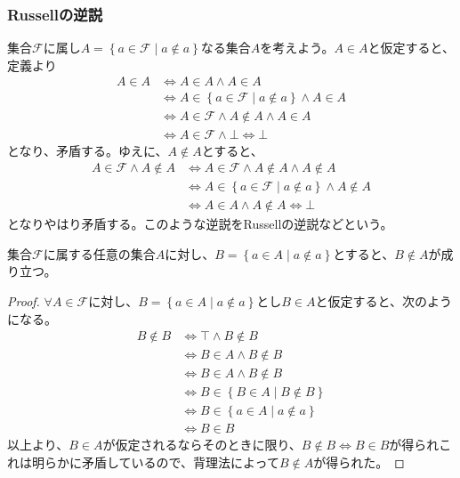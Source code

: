 \documentclass[a4paper]{jsarticle}
\begin{document}
\subsubsection{Russellの逆説}%
集合$\mathcal{F}$に属し$A = \left\{ a\in \mathcal{F} \middle| a \notin a \right\}$なる集合$A$を考えよう。$A \in A$と仮定すると、定義より
\begin{align*}
A \in A &\Leftrightarrow A \in A \land A \in A \\
&\Leftrightarrow A \in \left\{ a\in \mathcal{F} \middle| a \notin a \right\} \land A \in A \\
&\Leftrightarrow A\in \mathcal{F \land}A \notin A \land A \in A \\
&\Leftrightarrow A\in \mathcal{F \land \bot \Leftrightarrow \bot}
\end{align*}
となり、矛盾する。ゆえに、$A \notin A$とすると、
\begin{align*}
A\in \mathcal{F \land}A \notin A &\Leftrightarrow A\in \mathcal{F \land}A \notin A \land A \notin A\\
&\Leftrightarrow A \in \left\{ a\in \mathcal{F} \middle| a \notin a \right\} \land A \notin A\\
&\Leftrightarrow A \in A \land A \notin A \Leftrightarrow \bot
\end{align*}
となりやはり矛盾する。このような逆説をRussellの逆説などという。
\begin{thm}
\label{1.2.1.12}
集合$\mathcal{F}$に属する任意の集合$A$に対し、$B = \left\{ a \in A \middle| a \notin a \right\}$とすると、$B \notin A$が成り立つ。
\end{thm}
\begin{proof}
$\forall A\in \mathcal{F}$に対し、$B = \left\{ a \in A \middle| a \notin a \right\}$とし$B \in A$と仮定すると、次のようになる。
\begin{align*}
B \notin B &\Leftrightarrow \top \land B \notin B\\
&\Leftrightarrow B \in A \land B \notin B\\
&\Leftrightarrow B \in A \land B \notin B\\
&\Leftrightarrow B \in \left\{ B \in A \middle| B \notin B \right\}\\
&\Leftrightarrow B \in \left\{ a \in A \middle| a \notin a \right\}\\
&\Leftrightarrow B \in B
\end{align*}
以上より、$B \in A$が仮定されるならそのときに限り、$B \notin B \Leftrightarrow B \in B$が得られこれは明らかに矛盾しているので、背理法によって$B \notin A$が得られた。
\end{proof}
\end{document}
